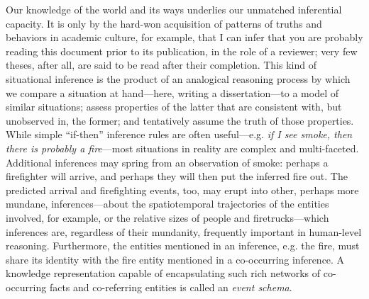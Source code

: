 Our knowledge of the world and its ways underlies our unmatched inferential capacity.
It is only by the hard-won acquisition of patterns of truths and behaviors in academic culture, for example, that I can infer that you are probably reading this document prior to its publication, in the role of a reviewer; very few theses, after all, are said to be read after their completion.
This kind of situational inference is the product of an analogical reasoning process by which we compare a situation at hand---here, writing a dissertation---to a model of similar situations; assess properties of the latter that are consistent with, but unobserved in, the former; and tentatively assume the truth of those properties.
While simple ``if-then'' inference rules are often useful---e.g. \textit{if I see smoke, then there is probably a fire}---most situations in reality are complex and multi-faceted. Additional inferences may spring from an observation of smoke: perhaps a firefighter will arrive, and perhaps they will then put the inferred fire out. The predicted arrival and firefighting events, too, may erupt into other, perhaps more mundane, inferences---about the spatiotemporal trajectories of the entities involved, for example, or the relative sizes of people and firetrucks---which inferences are, regardless of their mundanity, frequently important in human-level reasoning. Furthermore, the entities mentioned in an inference, e.g. the fire, must share its identity with the fire entity mentioned in a co-occurring inference. A knowledge representation capable of encapsulating such rich networks of co-occurring facts and co-referring entities is called an \textit{event schema}.


